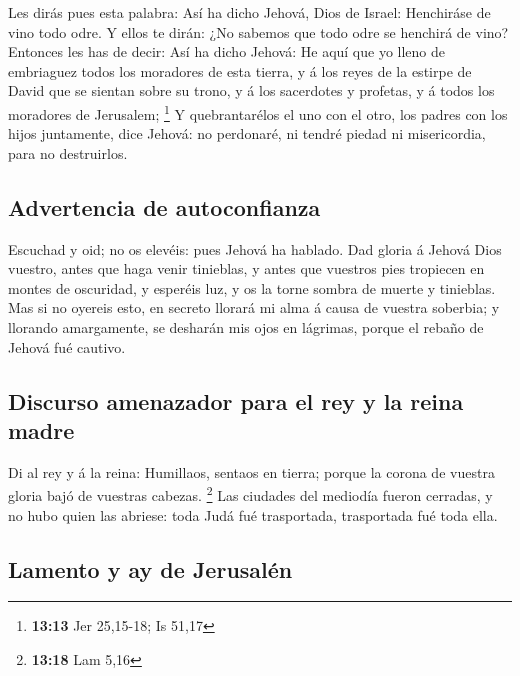  Les dirás pues esta palabra: Así ha dicho Jehová, Dios
de Israel: Henchiráse de vino todo odre. Y ellos te dirán: ¿No sabemos
que todo odre se henchirá de vino?  Entonces les has de
decir: Así ha dicho Jehová: He aquí que yo lleno de embriaguez todos los
moradores de esta tierra, y á los reyes de la estirpe de David que se
sientan sobre su trono, y á los sacerdotes y profetas, y á todos los
moradores de Jerusalem; \footnote{\textbf{13:13} Jer 25,15-18; Is 51,17}
 Y quebrantarélos el uno con el otro, los padres con los
hijos juntamente, dice Jehová: no perdonaré, ni tendré piedad ni
misericordia, para no destruirlos.

\hypertarget{advertencia-de-autoconfianza}{%
\subsection{Advertencia de
autoconfianza}\label{advertencia-de-autoconfianza}}

 Escuchad y oid; no os elevéis: pues Jehová ha hablado.
 Dad gloria á Jehová Dios vuestro, antes que haga venir
tinieblas, y antes que vuestros pies tropiecen en montes de oscuridad, y
esperéis luz, y os la torne sombra de muerte y tinieblas.
 Mas si no oyereis esto, en secreto llorará mi alma á
causa de vuestra soberbia; y llorando amargamente, se desharán mis ojos
en lágrimas, porque el rebaño de Jehová fué cautivo.

\hypertarget{discurso-amenazador-para-el-rey-y-la-reina-madre}{%
\subsection{Discurso amenazador para el rey y la reina
madre}\label{discurso-amenazador-para-el-rey-y-la-reina-madre}}

 Di al rey y á la reina: Humillaos, sentaos en tierra;
porque la corona de vuestra gloria bajó de vuestras cabezas. \footnote{\textbf{13:18}
  Lam 5,16}  Las ciudades del mediodía fueron cerradas, y
no hubo quien las abriese: toda Judá fué trasportada, trasportada fué
toda ella.

\hypertarget{lamento-y-ay-de-jerusaluxe9n}{%
\subsection{Lamento y ay de
Jerusalén}\label{lamento-y-ay-de-jerusaluxe9n}}

